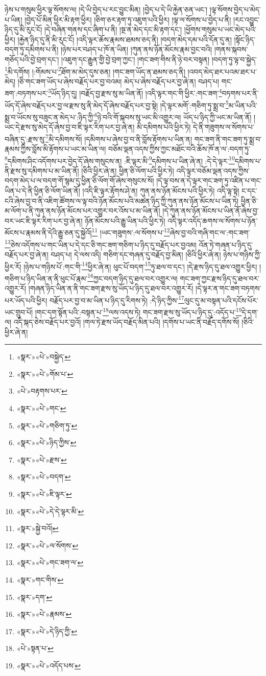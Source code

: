 ཉེས་པ་གསུམ་ཕྱིར་ལྟ་སོགས་ལ། །དེ་ཡི་བྱེད་པ་རང་བྱུང་མིན། །བྱེད་པ་དེ་ཡི་རྐྱེན་ཅན་ཡང་། །ལྟ་སོགས་བྱེད་པ་མེད་པ་ཡིན། །བྱེད་པོ་མིན་ཕྱིར་མི་རྟག་ཕྱིར། །ཅིག་ཅར་རྟག་ཏུ་འཇུག་པའི་ཕྱིར། །ལྟ་ལ་སོགས་པ་བྱེད་པ་ནི། །རང་འབྱུང་ཉིད་དུ་མི་རུང་ངོ། །དེ་བཞིན་གནས་དང་ཞིག་པ་ནི། །སྔ་ན་མེད་དང་མི་རྟག་དང་། །ཕྱོགས་གསུམ་པ་ཡང་མེད་པའི་ཕྱིར། །རྐྱེན་ཉིད་དུ་ནི་མི་རུང་ངོ། །འདི་ལྟར་ཆོས་རྣམས་ཐམས་ཅད་ནི། །བདག་མེད་དམ་པའི་དོན་དུ་ན། །སྟོང་ཉིད་བདག་ཏུ་དམིགས་པ་ནི། །ཉེས་པར་བཤད་པ་ཁོ་ན་ཡིན། །ཀུན་ནས་ཉོན་མོངས་རྣམ་བྱང་བའི། །གནས་སྐབས་གཅོད་པའི་བྱེ་བྲག་དང་། །འཇུག་དང་རྒྱུན་གྱི་བྱེ་བྲག་ཀྱང་། །གང་ཟག་གིས་ནི་ཉེ་བར་བསྟན། །བདག་ཏུ་ལྟ་བ་སྐྱེད་\footnote{«སྣར་»«པེ་»བསྐྱེད་}མི་དགོས། །:གོམས་པ་\footnote{«སྣར་»«པེ་»གོམ་པ་}ཐོག་མ་མེད་དུས་ཅན། །གང་ཟག་ཡོད་ན་ཐམས་ཅད་ནི། །འབད་མེད་ཐར་པའམ་ཐར་པ་མེད། །ཅི་གང་ཟག་ཡོད་པ་ཞེས་བརྗོད་པར་བྱ་བའམ། མེད་པ་ཞེས་བརྗོད་པར་བྱ་ཞེ་ན། བཤད་པ། གང་ཟག་:བཏགས་པར་\footnote{«པེ་»བརྟགས་པར་}ཡོད་ཉིད་དུ། །བརྗོད་བྱ་རྫས་སུ་མ་ཡིན་ནོ། །འདི་ལྟར་གང་གི་ཕྱིར་:གང་ཟག་\footnote{«སྣར་»«པེ་»གང་}བཏགས་པར་ནི་ཡོད་དོ་ཞེས་བརྗོད་པར་བྱ་ལ་རྫས་སུ་ནི་མེད་དོ་ཞེས་བརྗོད་པར་བྱ་སྟེ། །དེ་ལྟར་མགོ་:གཅིག་ཏུ་སྨྲ་བ་\footnote{«སྣར་»«པེ་»གཅིག་ཏུ་}མ་ཡིན་པའི་སྨྲ་བ་ཡོངས་སུ་བཟུང་ན་མེད་པ་:ཉིད་ཀྱི་\footnote{«སྣར་»«པེ་»ཉིད་ཀྱིས་}ཉེ་བའི་གོ་སྐབས་སུ་ཡང་མི་འགྱུར་ལ། ཡོད་པ་ཉིད་ཀྱི་ཡང་མ་ཡིན་ནོ། །ཡང་དེ་རྫས་སུ་མེད་དོ་ཞེས་བྱ་བ་ཇི་ལྟར་རིག་པར་བྱ་ཞེ་ན། མི་དམིགས་པའི་ཕྱིར་ཏེ། དེ་ནི་གཟུགས་ལ་སོགས་པ་བཞིན་དུ་:རྫས་སུ་\footnote{«སྣར་»«པེ་»རྫས་}མི་དམིགས་སོ། །དམིགས་པ་ཞེས་བྱ་བ་ནི་བློས་རྟོགས་པ་ཡིན་ན། གང་ཟག་ནི་གང་ཟག་ཏུ་སྨྲ་བ་རྣམས་ཀྱིས་བློས་མི་རྟོགས་པ་ཡང་མ་ཡིན་ལ། བཅོམ་ལྡན་འདས་ཀྱིས་ཀྱང་མཐོང་བའི་ཆོས་ཁོ་ན་ལ་:བདག་ཏུ་\footnote{«སྣར་»«པེ་»བདག་}དམིགས་ཤིང་འདོགས་པར་བྱེད་དོ་ཞེས་གསུངས་ན། :ཇི་ལྟར་མི་\footnote{«སྣར་»«པེ་»ཇི་ལྟར་}དམིགས་པ་ཡིན་ཞེ་ན། :དེ་དེ་ལྟར་\footnote{«སྣར་»«པེ་»དེ་དེ་ལྟར་མི་}དམིགས་པ་ནི་རྫས་སུ་དམིགས་པ་མ་ཡིན་ནོ། །ཅིའི་ཕྱིར་ཞེ་ན། ཕྱིན་ཅི་ལོག་པའི་ཕྱིར་ཏེ། འདི་ལྟར་བཅོམ་ལྡན་འདས་ཀྱིས་བདག་མེད་པ་ལ་བདག་གོ་སྙམ་དུ་ཕྱིན་ཅི་ལོག་གོ་ཞེས་གསུངས་སོ། །དེ་ལྟ་བས་ན་དེ་ལྟར་གང་ཟག་ཏུ་འཛིན་པ་གང་ཡིན་པ་དེ་ནི་ཕྱིན་ཅི་ལོག་ཡིན་ནོ། །འདི་ཇི་ལྟར་རྟོགས་ཤེ་ན། ཀུན་ནས་ཉོན་མོངས་པའི་ཕྱིར་ཏེ། འདི་ལྟ་སྟེ། ང་དང་ངའི་ཞེས་བྱ་བ་ནི་འཇིག་ཚོགས་ལ་ལྟ་བའི་ཉོན་མོངས་པའི་མཚན་ཉིད་ཀྱི་ཀུན་ནས་ཉོན་མོངས་པ་ཡིན་ཏེ། ཕྱིན་ཅི་མ་ལོག་པ་ནི་ཀུན་ནས་ཉོན་མོངས་པར་འགྱུར་བར་འོས་པ་མ་ཡིན་ནོ། །དེ་ཀུན་ནས་ཉོན་མོངས་པ་ཡིན་ནོ་ཞེས་བྱ་བར་ཡང་ཇི་ལྟར་རིག་པར་བྱ་ཞེ་ན། ཉོན་མོངས་པའི་རྒྱུ་ཡིན་པའི་ཕྱིར་ཏེ། འདི་ལྟར་འདོད་ཆགས་ལ་སོགས་པ་ཉོན་མོངས་པ་རྣམས་ནི་དེའི་རྒྱུ་ཅན་དུ་སྐྱེའོ།\footnote{«སྣར་»སྐྱེ་བའོ།} །ཡང་གཟུགས་:ལ་སོགས་པ་\footnote{«སྣར་»«པེ་»ལ་སོགས་}ཞེས་བྱ་བའི་གཞི་གང་ལ་:གང་ཟག་\footnote{«སྣར་»«པེ་»གང་ཟག་ལ་}ཅེས་འདོགས་པ་གང་ཡིན་པ་དེ་དང་ཅི་གང་ཟག་གཅིག་པ་ཉིད་དུ་བརྗོད་པར་བྱའམ། འོན་ཏེ་གཞན་པ་ཉིད་དུ་བརྗོད་པར་བྱ་ཞེ་ན། བཤད་པ། དེ་ལས་འདི། གཅིག་དང་གཞན་དུ་བརྗོད་བྱ་མིན། །ཅིའི་ཕྱིར་ཞེ་ན། ཉེས་པ་གཉིས་ཀྱི་ཕྱིར་རོ། །ཉེས་པ་གཉིས་པོ་:གང་གི་\footnote{«སྣར་»གང་གིས་}ཕྱིར་ཞེ་ན། ཕུང་པོ་བདག་\footnote{«སྣར་»དག་}ཏུ་ཐལ་བ་དང་། །དེ་རྫས་ཉིད་དུ་ཐལ་འགྱུར་ཕྱིར། །གཅིག་པ་ཉིད་ཡིན་ན་ནི་ཕུང་པོ་རྣམ་\footnote{«སྣར་»«པེ་»རྣམས་}ཀྱང་བདག་ཉིད་དུ་ཐལ་བར་འགྱུར་ལ། གང་ཟག་ཀྱང་རྫས་ཉིད་དུ་ཐལ་བར་འགྱུར་རོ། །གཞན་ཉིད་ཡིན་ན་ནི་གང་ཟག་རྫས་སུ་ཡོད་པ་ཉིད་དུ་ཐལ་བར་འགྱུར་རོ། །དེ་ལྟར་ན་གང་ཟག་བཏགས་པར་ཡོད་པའི་ཕྱིར། བརྗོད་པར་བྱ་བ་མ་ཡིན་པ་ཉིད་དུ་རིགས་ཏེ། :དེ་ཉིད་ཀྱིས་\footnote{«སྣར་»«པེ་»དེ་ཉིད་ཀྱི་}ལུང་དུ་མ་བསྟན་པའི་དངོས་པོར་ཡང་གྲུབ་པོ། །གང་དག་སྟོན་པའི་:བསྟན་པ་\footnote{«པེ་»སྟན་པ་}ལས་འདས་ཏེ། གང་ཟག་རྫས་སུ་ཡོད་པ་ཉིད་དུ་:འདོད་པ་\footnote{«སྣར་»«པེ་»འདོད་པས་}དེ་དག་ལ། འདི་སྐད་ཅེས་བརྗོད་པར་བྱའོ། །གལ་ཏེ་རྫས་ཡོད་བརྗོད་མིན་པའི། །དགོས་པ་ཡང་ནི་བརྗོད་དགོས་སོ། །ཅིའི་ཕྱིར་ཞེ་ན། 